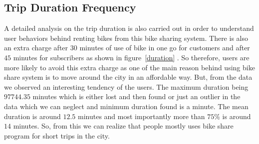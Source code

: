\subsection {Trip Duration Frequency}
\label{trip}




A detailed analysis on the trip duration is also carried out in order to understand user behaviors behind renting bikes from this bike sharing system. There is also an extra charge after $30$ minutes of use of bike in one go for customers and after $45$ minutes for subscribers as shown in figure~\ref{duration} . So therefore, users are more likely to avoid this extra charge as one of the main reason behind using bike share system is to move around the city in an affordable way. But, from the data we observed an interesting tendency of the users. The maximum duration being $97744.35$ minutes which is either lost and then found or just an outlier in the data which we can neglect and minimum duration found is a minute. The mean duration is around $12.5$ minutes and most importantly more than $75\%$ is around $14$ minutes. So, from this we can realize that people mostly uses bike share program for short trips in the city.

\begin{figure}
\centering
{}
\end{figure}

